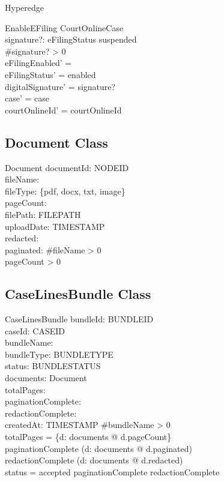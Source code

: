 \documentclass{article}
\begin{document}
\begin{class}{Hyperedge}
\begin{schema}{EnableEFiling}
    \Delta CourtOnlineCase \\
    signature?: \seq \char
\where
    eFilingStatus \neq suspended \\
    \#signature? > 0 \\
    eFilingEnabled' = \true \\
    eFilingStatus' = enabled \\
    digitalSignature' = signature? \\
    case' = case \\
    courtOnlineId' = courtOnlineId
\end{schema}

\subsection{Document Class}

\begin{class}{Document}
    documentId: NODEID \\
    fileName: \seq \char \\
    fileType: \{pdf, docx, txt, image\} \\
    pageCount: \nat \\
    filePath: FILEPATH \\
    uploadDate: TIMESTAMP \\
    redacted: \bool \\
    paginated: \bool
\where
    \#fileName > 0 \\
    pageCount > 0
\end{class}

\subsection{CaseLinesBundle Class}

\begin{class}{CaseLinesBundle}
    bundleId: BUNDLEID \\
    caseId: CASEID \\
    bundleName: \seq \char \\
    bundleType: BUNDLETYPE \\
    status: BUNDLESTATUS \\
    documents: \seq Document \\
    totalPages: \nat \\
    paginationComplete: \bool \\
    redactionComplete: \bool \\
    createdAt: TIMESTAMP
\where
    \#bundleName > 0 \\
    totalPages = \sum \{d: \ran documents @ d.pageCount\} \\
    paginationComplete \iff (\forall d: \ran documents @ d.paginated) \\
    redactionComplete \iff (\forall d: \ran documents @ d.redacted) \\
    status = accepted \implies paginationComplete \land redactionComplete
\end{class}


\end{class}
\end{document}
